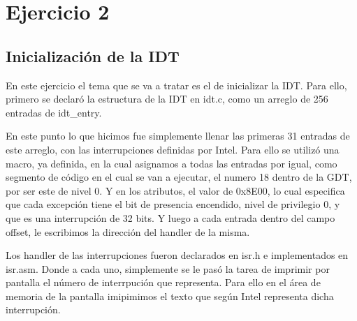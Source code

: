 \section{Ejercicio 2}
\subsection*{Inicialización de la IDT}
\par{En este ejercicio el tema que se va a tratar es el de inicializar la IDT. Para ello, primero se declaró la estructura de la IDT en idt.c, como un arreglo de 256 entradas de idt\_entry.}
\par{En este punto lo que hicimos fue simplemente llenar las primeras 31 entradas de este arreglo, con las interrupciones definidas por Intel. Para ello se utilizó una macro, ya definida, en la cual asignamos a todas las entradas por igual, como segmento de código en el cual se van a ejecutar, el numero 18 dentro de la GDT, por ser este de nivel 0. Y en los atributos, el valor de 0x8E00, lo cual especifica que cada excepción tiene el bit de presencia encendido, nivel de privilegio 0, y que es una interrupción de 32 bits. Y luego a cada entrada dentro del campo offset, le escribimos la dirección del handler de la misma.}
\par{Los handler de las interrupciones fueron declarados en isr.h e implementados en isr.asm. Donde a cada uno, simplemente se le pasó la tarea de imprimir por pantalla el número de interrpución que representa. Para ello en el área de memoria de la pantalla imipimimos el texto que según Intel representa dicha interrupción.}

\clearpage